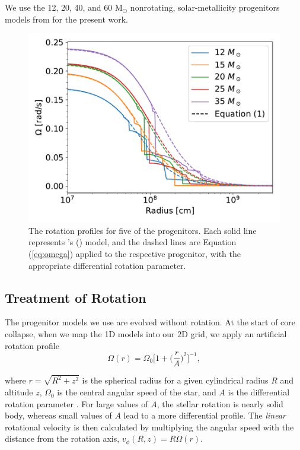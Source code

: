 \documentclass[twocolumn,times]{aastex62}  %
\newcommand{\Msun}{\ensuremath{\mathrm{M}_\odot}\xspace}
\begin{document}
We use the 12, 20, 40, and 60 \Msun nonrotating, solar-metallicity progenitors models from \citet{Suk:2016} for the present work.

\begin{figure}[t]
    \centering
    \includegraphics[scale=0.45]{omega_vs_r.pdf}
    \caption{The rotation profiles for five of the \citet{heger:2005} progenitors.  Each solid line represents \citeauthor{heger:2005}'s (\citeyear{heger:2005}) model, and the dashed lines are Equation (\ref{eq:omega}) applied to the respective progenitor, with the appropriate differential rotation parameter.  }
    \label{fig:ovsr}
\end{figure}

\subsection{Treatment of Rotation}




The progenitor models we use are evolved without rotation.
At the start of core collapse, when we map the 1D models into our 2D grid, we apply an artificial rotation profile
\begin{equation}
    \Omega(r) = \Omega_0 \bigg[1 + \bigg(\frac{r}{A}\bigg)^2 \bigg]^{-1}, 
    \label{eq:omega}
\end{equation}

where $r = \sqrt{R^2 + z^2}$ is the spherical radius for a given cylindrical radius $R$ and altitude $z$, $\Omega_0$ is the central angular speed of the star, and $A$ is the differential rotation parameter \citep{eriguchi:1985}.  For large values of $A$, the stellar rotation is nearly solid body, whereas small values of $A$ lead to a more differential profile. 
The {\it linear} rotational velocity is then calculated by multiplying the angular speed with the distance from the rotation axis, $v_\phi (R, z) = R \Omega (r) $. 
\end{document}
